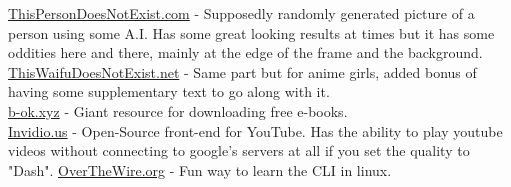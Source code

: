 \documentclass{article}
\begin{document}
\href{https://thispersondoesnotexist.com/}{ThisPersonDoesNotExist.com} - Supposedly randomly generated picture of a person using some A.I. Has some great looking results at times but it has some oddities here and there, mainly at the edge of the frame and the background.\\
\href{https://www.thiswaifudoesnotexist.net/}{ThisWaifuDoesNotExist.net} - Same part but for anime girls, added bonus of having some supplementary text to go along with it.\\
\href{https://b-ok.xyz/}{b-ok.xyz} - Giant resource for downloading free e-books.\\
\href{https://invidio.us/}{Invidio.us} - Open-Source front-end for YouTube. Has the ability to play youtube videos without connecting to google's servers at all if you set the quality to "Dash".
\href{http://overthewire.org/}{OverTheWire.org} - Fun way to learn the CLI in linux.
\end{document}

